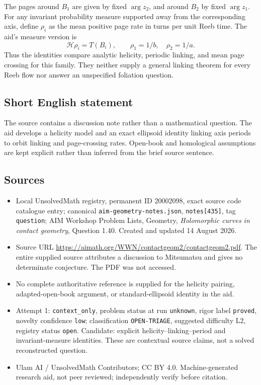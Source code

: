 \documentclass[11pt]{article}
\begin{document}
The pages around \(B_1\) are given by fixed \(\arg z_2\), and around \(B_2\) by fixed \(\arg z_1\). For any invariant probability measure supported away from the corresponding axis, define \(\rho_i\) as the mean positive page rate in turns per unit Reeb time. The aid's measure version is
\[
 \mathcal H\rho_i=T(B_i),\qquad \rho_1=1/b,\quad\rho_2=1/a.
\]
Thus the identities compare analytic helicity, periodic linking, and mean page crossing for this family. They neither supply a general linking theorem for every Reeb flow nor answer an unspecified foliation question.
\subsection{Short English statement}
The source contains a discussion note rather than a mathematical question. The aid develops a helicity model and an exact ellipsoid identity linking axis periods to orbit linking and page-crossing rates. Open-book and homological assumptions are kept explicit rather than inferred from the brief source sentence.
\subsection{Sources}
\begin{itemize}
\item Local UnsolvedMath registry, permanent ID 20002098, exact source code catalogue entry; canonical \texttt{aim-geometry-notes.json}, \texttt{notes[435]}, tag \texttt{question}; AIM Workshop Problem Lists, Geometry, \emph{Holomorphic curves in contact geometry}, Question 1.40. Created and updated 14 August 2026.
\item Source URL \url{https://aimath.org/WWN/contactgeom2/contactgeom2.pdf}. The entire supplied source attributes a discussion to Mitsumatsu and gives no determinate conjecture. The PDF was not accessed.
\item No complete authoritative reference is supplied for the helicity pairing, adapted-open-book argument, or standard-ellipsoid identity in the aid.
\item Attempt 1: \texttt{context\_only}, problem status at run \texttt{unknown}, rigor label \texttt{proved}, novelty confidence \texttt{low}; classification \texttt{OPEN-TRIAGE}, suggested difficulty L2, registry status \texttt{open}. Candidate: explicit helicity--linking--period and invariant-measure identities. These are contextual source claims, not a solved reconstructed question.
\item Ulam AI / UnsolvedMath Contributors; CC BY 4.0. Machine-generated research aid, not peer reviewed; independently verify before citation.
\end{itemize}
\end{document}
